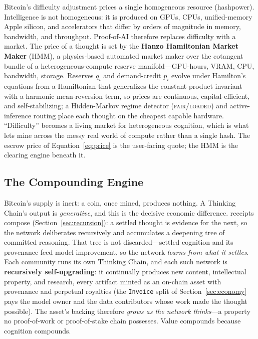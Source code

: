 Bitcoin's difficulty adjustment prices a single homogeneous resource (hashpower). Intelligence is not homogeneous: it is produced on GPUs, CPUs, unified-memory Apple silicon, and accelerators that differ by orders of magnitude in memory, bandwidth, and throughput. Proof-of-AI therefore replaces difficulty with a market. The price of a thought is set by the \textbf{Hanzo Hamiltonian Market Maker} (HMM), a physics-based automated market maker over the cotangent bundle of a heterogeneous-compute reserve manifold---GPU-hours, VRAM, CPU, bandwidth, storage. Reserves $q_i$ and demand-credit $p_i$ evolve under Hamilton's equations from a Hamiltonian that generalizes the constant-product invariant with a harmonic mean-reversion term, so prices are continuous, capital-efficient, and self-stabilizing; a Hidden-Markov regime detector (\textsc{fair}/\textsc{loaded}) and active-inference routing place each thought on the cheapest capable hardware. ``Difficulty'' becomes a living market for heterogeneous cognition, which is what lets \PoAI{} mine across the messy real world of compute rather than a single hash. The escrow price of Equation~\ref{eq:price} is the user-facing quote; the HMM is the clearing engine beneath it.

\subsection{The Compounding Engine}
\label{sec:ai-bitcoin-compounding}

Bitcoin's supply is inert: a coin, once mined, produces nothing. A Thinking Chain's output is \emph{generative}, and this is the decisive economic difference. \PoT{} receipts compose (Section~\ref{sec:recursion}): a settled thought is evidence for the next, so the network deliberates recursively and accumulates a deepening tree of committed reasoning. That tree is not discarded---settled cognition and its provenance feed model improvement, so the network \emph{learns from what it settles}. Each community runs its own Thinking Chain, and each such network is \textbf{recursively self-upgrading}: it continually produces new content, intellectual property, and research, every artifact minted as an on-chain asset with provenance and perpetual royalties (the \texttt{Invoice} split of Section~\ref{sec:economy} pays the model owner and the data contributors whose work made the thought possible). The asset's backing therefore \emph{grows as the network thinks}---a property no proof-of-work or proof-of-stake chain possesses. Value compounds because cognition compounds.

